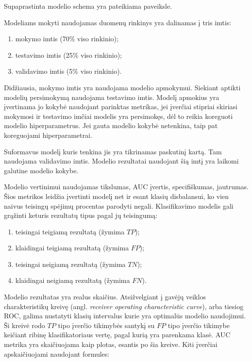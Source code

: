 
Supaprastinta modelio schema yra pateikiama  paveiksle.

Modeliams mokyti naudojamas duomenų rinkinys yra dalinamas į tris imtis:
\begin{enumerate}
    \item mokymo imtis (70\% viso rinkinio);
    \item testavimo imtis (25\% viso rinkinio);
    \item validavimo imtis (5\% viso rinkinio).
\end{enumerate}
Didžiausia, mokymo imtis yra naudojama modelio apmokymui. Siekiant aptikti modelių persimokymą naudojama
testavimo imtis. Modelį apmokius yra įvertinama jo kokybė naudojant parinktas metrikas, jei įverčiai stipriai
skiriasi mokymosi ir testavimo imčiai modelis yra persimokęs, dėl to reikia koreguoti modelio hiperparametrus.
Jei gauta modelio kokybė netenkina,  taip pat koreguojami hiperparametrai.

Suformavus modelį kuris tenkina jis yra tikrinamas paskutinį kartą. Tam naudojama validavimo imtis.
Modelio rezultatai naudojant šią imtį yra laikomi galutine modelio kokybe.


Modelio vertinimui naudojamas tikslumas, AUC įvertis, specifiškumas, jautrumas. Šios metrikos leidžia
 įvertinti modelį net ir esant klasių disbalansui, ko vien naivus teisingų spėjimų procentas parodyti
  negali. Klasifikavimo modelis gali grąžinti keturis rezultatų tipus pagal jų teisingumą:
\begin{enumerate}
    \item teisingai teigiamą rezultatą (žymima $TP$);
    \item klaidingai teigiamą rezultatą (žymima $FP$);
    \item teisingai neigiamą rezultatą (žymima $TN$);
    \item klaidingai neigiamą rezultatą (žymima $FN$).
\end{enumerate}

 Modelio rezultatas yra realus skaičius. Atsižvelgiant į gavėjų veiklos charakteristikų kreivę
(angl. \textit{receiver operating characteristic curve}), arba tiesiog ROC, galima nustatyti
klasių intervalus kurie yra optimalūs modelio naudojimui. Ši kreivė rodo $TP$ tipo įverčio
tikimybės santykį su $FP$ tipo įverčio tikimybe keičiant ribinę klasifikatoriaus vertę, pagal
kurią yra parenkama klasė. AUC metrika yra skaičiuojama kaip plotas, esantis po šia kreive.
Kiti įverčiai apskaičiuojami naudojant formules:

